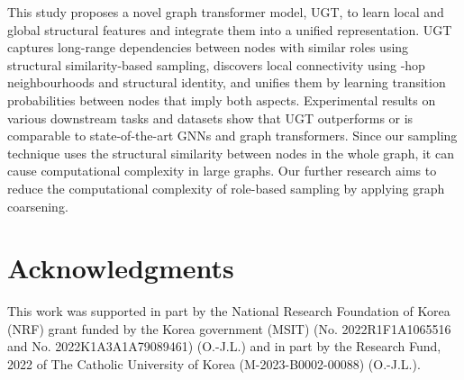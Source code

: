 \documentclass[oneside]{article}
\begin{document}
This study proposes a novel graph transformer model, UGT, to learn local and global structural features and integrate them into a unified representation.
UGT captures long-range dependencies between nodes with similar roles using structural similarity-based sampling, discovers local connectivity using -hop neighbourhoods and structural identity, and unifies them by learning transition probabilities between nodes that imply both aspects. 
Experimental results on various downstream tasks and datasets show that UGT outperforms or is comparable to state-of-the-art GNNs and graph transformers. 
Since our sampling technique uses the structural similarity between nodes in the whole graph, it can cause computational complexity in large graphs.
Our further research aims to reduce the computational complexity of role-based sampling by applying graph coarsening.





\section*{Acknowledgments}
This work was supported 
in part by the National Research Foundation of Korea (NRF) grant funded by the Korea government (MSIT) (No. 2022R1F1A1065516 and No. 2022K1A3A1A79089461) (O.-J.L.) 
and
in part by the Research Fund, 2022 of The Catholic University of Korea (M-2023-B0002-00088) (O.-J.L.). 

  
  
\end{document}

